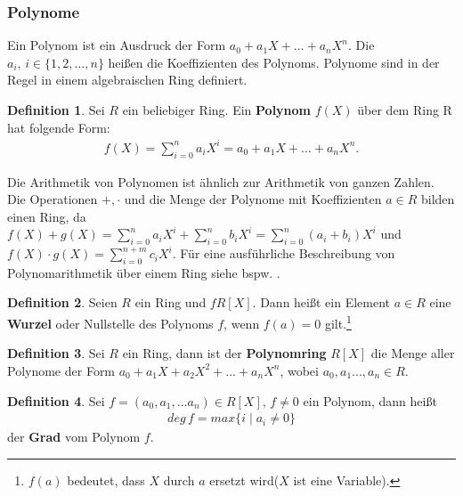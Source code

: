 \documentclass[12pt,oneside]{article}
\theoremstyle{remark}
\theoremstyle{definition}
\newtheorem{definition}{Definition}[section]
\begin{document}
\smallskip




\subsubsection{Polynome}
Ein Polynom ist ein Ausdruck der Form $a_0 + a_{1} X + \dots + a_{n}X^n$. Die $a_{i}, \, i \in \{1,2, \dots, n\}$ heißen die Koeffizienten des Polynoms. Polynome sind in der Regel in einem algebraischen Ring definiert.

\begin{definition}
Sei $R$ ein beliebiger Ring. Ein \textbf{Polynom} $f(X)$ über dem Ring R hat folgende Form:
\begin{align*}
    f(X) = \sum_{i = 0}^{n} a_{i}X^i = a_0 + a_{1} X + \dots + a_{n}X^n.
\end{align*}

Die Arithmetik von Polynomen ist ähnlich zur Arithmetik von ganzen Zahlen. Die Operationen $+, \cdot$ und die Menge der Polynome mit Koeffizienten $a \in R$ bilden einen Ring, da $f(X) + g(X)  =  \sum_{i = 0}^{n} a_{i}X^i + \sum_{i = 0}^{n} b_{i}X^i = \sum_{i = 0}^{n} (a_{i} + b_{i})X^i$ und $f(X) \cdot g(X) = \sum_{i = 0}^{n + m} c_{i}X^i$. Für eine ausführliche Beschreibung von Polynomarithmetik über einem Ring siehe bspw. \cite{fields}. 
\end{definition}

\begin{definition}\label{polynom-ring}
Seien $R$ ein Ring und $f R[X]$. Dann heißt ein Element $a \in R$ eine \textbf{Wurzel} oder Nullstelle des Polynoms $f$, wenn $f(a) = 0$ gilt.\footnote{$f(a)$ bedeutet, dass $X$ durch $a$ ersetzt wird($X$ ist eine Variable).}
\end{definition}

\begin{definition}
Sei $R$ ein Ring, dann ist der \textbf{Polynomring} $R[X]$ die Menge aller Polynome der Form $a_{0} + a_{1}X + a_{2} X^2 + ... + a_{n}X^n$, wobei $a_{0},a_{1}...,a_{n} \in R$.
\end{definition}

\smallskip

\begin{definition}
Sei $f = (a_0, a_1,...a_n) \in R[X], \, f \neq 0 $ ein Polynom, dann heißt
\begin{align*}
    deg \, f = max \{ i  \mid a_i \neq 0 \}
\end{align*}
der \textbf{Grad} vom Polynom $f$.  
\end{definition}
\end{document}
